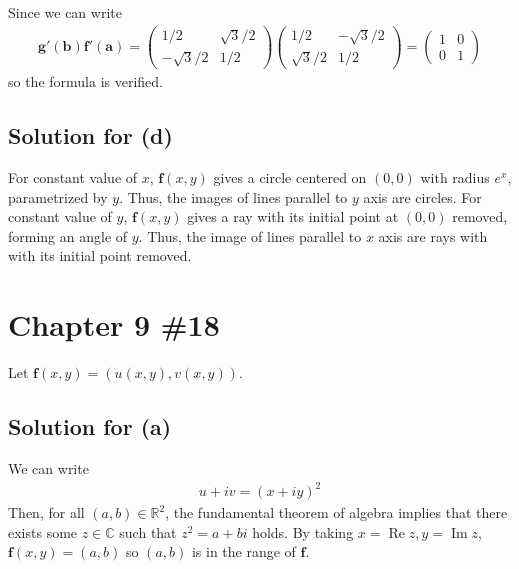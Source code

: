 \documentclass{scrartcl}
\newcommand{\imag}{\operatorname{Im}}
\newcommand{\real}{\operatorname{Re}}
\begin{document}
Since we can write
\begin{align*}
  \mathbf{g}'(\mathbf{b}) \mathbf{f}'(\mathbf{a})
  = \begin{pmatrix}
    1 / 2 & \sqrt{3} / 2 \\
    -\sqrt{3} / 2 & 1 / 2
  \end{pmatrix} \begin{pmatrix}
    1 / 2 & -\sqrt{3} / 2 \\
    \sqrt{3} / 2 & 1 / 2
  \end{pmatrix}
  = \begin{pmatrix}
    1 & 0 \\
    0 & 1
  \end{pmatrix}
\end{align*}
so the formula is verified.

\subsection{Solution for (d)}
For constant value of \(x\), \(\mathbf{f}(x, y)\) gives a circle centered on
\((0, 0)\) with radius \(e^x\), parametrized by \(y\). Thus, the images of
lines parallel to \(y\) axis are circles. For constant value of \(y\),
\(\mathbf{f}(x, y)\) gives a ray with its initial point at \((0, 0)\) removed,
forming an angle of \(y\). Thus, the image of lines parallel to \(x\) axis are
rays with with its initial point removed.

\section{Chapter 9 \#18}
Let \(\mathbf{f}(x, y) = (u(x, y), v(x, y))\).

\subsection{Solution for (a)}
We can write
\begin{align*}
  u + iv = (x + iy)^2
\end{align*}
Then, for all \((a, b) \in \mathbb{R}^2\), the fundamental theorem of algebra
implies that there exists some \(z \in \mathbb{C}\) such that \(z^2 = a + bi\)
holds. By taking \(x = \real z, y = \imag z\), \(\mathbf{f}(x, y) = (a, b)\) so
\((a, b)\) is in the range of \(\mathbf{f}\).
\end{document}
